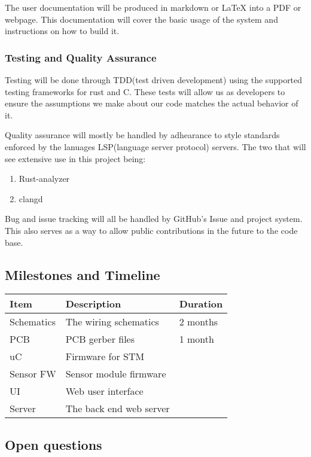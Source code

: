 The user documentation will be produced in markdown or LaTeX into a PDF
or webpage. This documentation will cover the basic usage of the system
and instructions on how to build it.

\hypertarget{testing-and-quality-assurance}{%
\subsubsection{Testing and Quality
Assurance}\label{testing-and-quality-assurance}}

Testing will be done through TDD(test driven development) using the
supported testing frameworks for rust and C. These tests will allow us
as developers to ensure the assumptions we make about our code matches
the actual behavior of it.

Quality assurance will mostly be handled by adhearance to style
standards enforced by the lanuages LSP(language server protocol)
servers. The two that will see extensive use in this project being:

\begin{enumerate}
\def\labelenumi{\arabic{enumi}.}
\tightlist
\item
  Rust-analyzer
\item
  clangd
\end{enumerate}

Bug and issue tracking will all be handled by GitHub's Issue and project
system. This also serves as a way to allow public contributions in the
future to the code base.

\hypertarget{milestones-and-timeline}{%
\subsection{Milestones and Timeline}\label{milestones-and-timeline}}

\begin{longtable}[]{@{}lll@{}}
\toprule
Item & Description & Duration\tabularnewline
\midrule
\endhead
Schematics & The wiring schematics & 2 months\tabularnewline
PCB & PCB gerber files & 1 month\tabularnewline
uC & Firmware for STM &\tabularnewline
Sensor FW & Sensor module firmware &\tabularnewline
UI & Web user interface &\tabularnewline
Server & The back end web server &\tabularnewline
\bottomrule
\end{longtable}

\hypertarget{open-questions}{%
\subsection{Open questions}\label{open-questions}}

